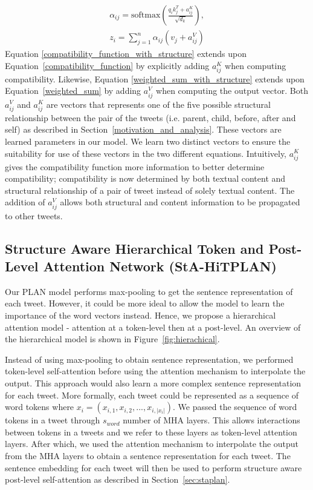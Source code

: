 \documentclass[letterpaper]{article} %
\begin{document}
\begin{eqnarray}
\alpha_{ij} = \mathrm{softmax}(\frac{q_{i}k_{j}^T + a_{ij}^K}{\sqrt{d_{k}}}) \label{compatibility_function_with_structure}, \\
z_i = \sum_{j=1}^{n} \alpha_{ij} (v_j + a_{ij}^V) \label{weighted_sum_with_structure}
\end{eqnarray}
Equation \ref{compatibility_function_with_structure} extends upon Equation~\ref{compatibility_function} by explicitly adding $a_{ij}^K$ when computing compatibility. Likewise, Equation \ref{weighted_sum_with_structure} extends upon Equation~\ref{weighted_sum} by adding $a_{ij}^V$ when computing the output vector.
Both $a_{ij}^V$ and $a_{ij}^K$ are vectors that represents one of the five possible structural relationship between the pair of the tweets (i.e. parent, child, before, after and self) as described in Section~\ref{motivation_and_analysis}. These vectors are learned parameters in our model. We learn two distinct vectors to ensure the suitability for use of these vectors in the two different equations.
Intuitively, $a_{ij}^K$ gives the compatibility function more information to better determine compatibility; compatibility is now determined by both textual content and structural relationship of a pair of tweet instead of solely textual content. The addition of $a_{ij}^V$ allows both structural and content information to be propagated to other tweets.

\subsection{Structure Aware Hierarchical Token and Post-Level Attention Network (StA-HiTPLAN)}
\label{sec:stahitplan}
Our PLAN model performs max-pooling to get the sentence representation of each tweet. However, it could be more ideal to allow the model to learn the importance of the word vectors instead. Hence, we propose a hierarchical attention model - attention at a token-level then at a post-level. An overview of the hierarchical model is shown in Figure~\ref{fig:hierachical}.

Instead of using max-pooling to obtain sentence representation, we performed token-level self-attention before using the attention mechanism to interpolate the output. This approach would also learn a more complex sentence representation for each tweet. More formally, each tweet could be represented as a sequence of word tokens where  $x_{i} = (x_{i,1}, x_{i,2}, ..., x_{i,|x_i|})$. We passed the sequence of word tokens in a tweet through $s_{word}$ number of MHA layers. This allows interactions between tokens in a tweets and we refer to these layers as token-level attention layers. After which, we used the attention mechanism to interpolate the output from the MHA layers to obtain a sentence representation for each tweet. The sentence embedding for each tweet will then be used to perform structure aware post-level self-attention as described in Section~\ref{sec:staplan}.
\end{document}
